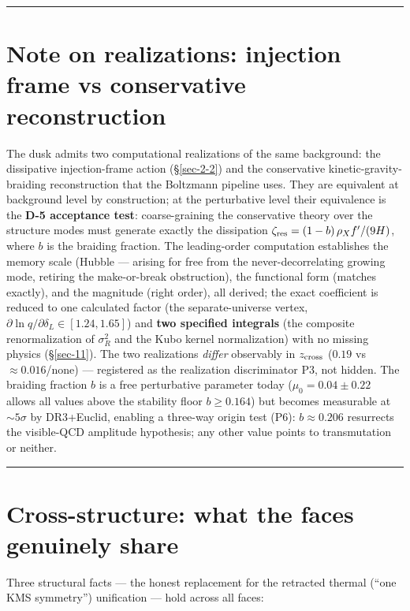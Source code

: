 \documentclass[submission, Phys]{SciPost}
\begin{document}
\begin{center}\rule{0.5\linewidth}{0.5pt}\end{center}

\section{Note on realizations: injection frame vs conservative
reconstruction}\label{sec-6}

The dusk admits two computational realizations of the same background:
the dissipative injection-frame action (§\ref{sec-2-2}) and the
conservative kinetic-gravity-braiding reconstruction that the Boltzmann
pipeline uses. They are equivalent at background level by construction;
at the perturbative level their equivalence is the \textbf{D-5
acceptance test}: coarse-graining the conservative theory over the
structure modes must generate exactly the dissipation
\(\zeta_{\rm res} = (1-b)\,\rho_X f'/(9H)\), where \(b\) is the braiding
fraction. The leading-order computation establishes the memory scale
(Hubble --- arising for free from the never-decorrelating growing mode,
retiring the make-or-break obstruction), the functional form (matches
exactly), and the magnitude (right order), all derived; the exact
coefficient is reduced to one calculated factor (the separate-universe
vertex, \(\partial\ln q/\partial\delta_L\in[1.24, 1.65]\)) and
\textbf{two specified integrals} (the composite renormalization of
\(\sigma_R^2\) and the Kubo kernel normalization) with no missing
physics (§\ref{sec-11}). The two realizations \emph{differ} observably
in \(z_{\rm cross}\) (\(0.19\) vs \(\approx 0.016\)/none) --- registered
as the realization discriminator P3, not hidden. The braiding fraction
\(b\) is a free perturbative parameter today (\(\mu_0 = 0.04\pm0.22\)
allows all values above the stability floor \(b\ge 0.164\)) but becomes
measurable at \(\sim 5\sigma\) by DR3+Euclid, enabling a three-way
origin test (P6): \(b\approx 0.206\) resurrects the visible-QCD
amplitude hypothesis; any other value points to transmutation or
neither.

\begin{center}\rule{0.5\linewidth}{0.5pt}\end{center}

\section{Cross-structure: what the faces genuinely share}\label{sec-7}

Three structural facts --- the honest replacement for the retracted
thermal (``one KMS symmetry'') unification --- hold across all faces:
\end{document}
